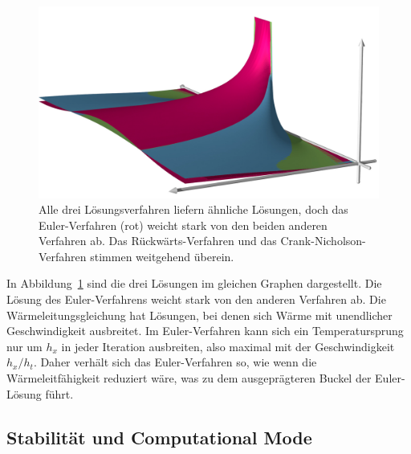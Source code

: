 \begin{figure}
\centering
\includegraphics{chapters/70-pde/images/combined.jpg}
\caption{Alle drei Lösungsverfahren liefern ähnliche Lösungen,
doch das Euler-Verfahren (rot) weicht stark von den beiden anderen
Verfahren ab.
Das Rückwärts-Verfahren und das Crank-Nicholson-Verfahren stimmen
weitgehend überein.
\label{buch:pde:waerme:figure:combined}}
\end{figure}
In Abbildung~\ref{buch:pde:waerme:figure:combined} sind die drei
Lösungen im gleichen Graphen dargestellt. 
Die Lösung des Euler-Verfahrens weicht stark von den anderen Verfahren ab.
Die Wärmeleitungsgleichung hat Lösungen, bei denen sich Wärme mit
unendlicher Geschwindigkeit ausbreitet.
Im Euler-Verfahren kann sich ein Temperatursprung nur um $h_x$ in
jeder Iteration ausbreiten, also maximal mit der Geschwindigkeit $h_x/h_t$.
Daher verhält sich das Euler-Verfahren so, wie wenn die Wärmeleitfähigkeit
reduziert wäre, was zu dem ausgeprägteren Buckel der Euler-Lösung
führt.


%
\subsection{Stabilität und Computational Mode
\label{pde:subsection:stabilitaet}}







